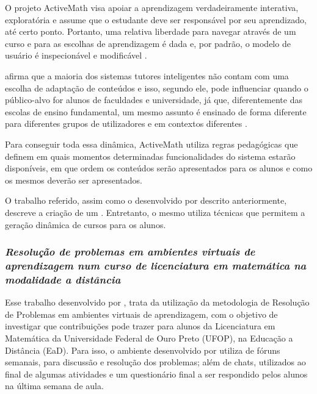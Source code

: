 O projeto ActiveMath visa apoiar a aprendizagem verdadeiramente interativa, exploratória e assume que o estudante deve ser responsável por seu aprendizado, até certo ponto. Portanto, uma relativa liberdade para navegar através de um curso e para as escolhas de aprendizagem é dada e, por padrão, o modelo de usuário é inspecionável e modificável \cite{melis2001activemath}.

 afirma que a maioria dos sistemas tutores inteligentes não contam com uma escolha de adaptação de conteúdos e isso, segundo ele, pode influenciar quando o público-alvo for alunos de faculdades e universidade, já que, diferentemente das escolas de ensino fundamental,  um mesmo assunto é
ensinado de forma diferente para diferentes grupos de utilizadores e em contextos diferentes \cite{melis2001activemath}.

Para conseguir toda essa dinâmica, ActiveMath utiliza regras pedagógicas que definem em quais momentos determinadas funcionalidades do sistema estarão disponíveis, em que ordem os conteúdos serão apresentados para os alunos e como os mesmos deverão ser apresentados.

O trabalho referido,  assim como o desenvolvido por  descrito anteriormente, descreve a criação de um \SystemType. Entretanto, o mesmo utiliza técnicas que permitem a geração dinâmica de cursos para os alunos.


\subsubsection{\textit{Resolução de problemas em ambientes virtuais de aprendizagem num curso de licenciatura em matemática na modalidade a distância}}

Esse trabalho desenvolvido por , trata da   utilização da metodologia de Resolução de Problemas em ambientes virtuais de  aprendizagem, com o objetivo de investigar que contribuições pode trazer para 
alunos da Licenciatura em Matemática da Universidade Federal de Ouro Preto (UFOP), na Educação a Distância (EaD). Para isso, o ambiente desenvolvido por  utiliza de fóruns semanais, para discussão e resolução dos problemas; além de chats, utilizados ao final de algumas atividades e um questionário final a ser respondido pelos alunos na última semana de aula.

